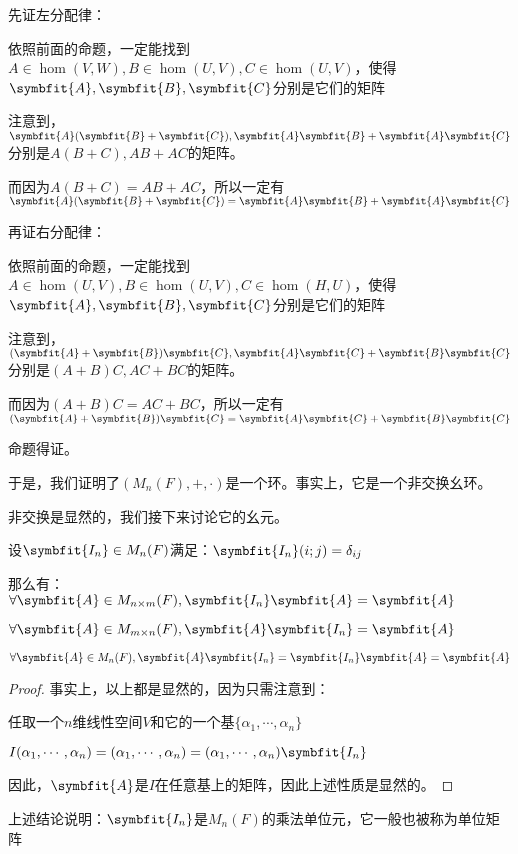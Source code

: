 \documentclass[12pt, a4paper, oneside, UTF8]{ctexbook}
\begin{document}
\begin{para}{0}
\begin{proposition}
						先证左分配律：
						
						依照前面的命题，一定能找到$A \in \hom(V,W),B \in \hom(U,V),C \in \hom(U,V)$，使得$\symbfit{A},\symbfit{B},\symbfit{C}$分别是它们的矩阵

						注意到，$\symbfit{A}(\symbfit{B}+\symbfit{C}),\symbfit{A}\symbfit{B}+\symbfit{A}\symbfit{C}$分别是$A(B+C),AB+AC$的矩阵。
						
						而因为$A(B+C)=AB+AC$，所以一定有$\symbfit{A}(\symbfit{B}+\symbfit{C})=\symbfit{A}\symbfit{B}+\symbfit{A}\symbfit{C}$

						再证右分配律：

						依照前面的命题，一定能找到$A \in \hom(U,V),B \in \hom(U,V),C \in \hom(H,U)$，使得$\symbfit{A},\symbfit{B},\symbfit{C}$分别是它们的矩阵

						注意到，$(\symbfit{A}+\symbfit{B})\symbfit{C},\symbfit{A}\symbfit{C}+\symbfit{B}\symbfit{C}$分别是$(A+B)C,AC+BC$的矩阵。
						
						而因为$(A+B)C=AC+BC$，所以一定有$(\symbfit{A}+\symbfit{B})\symbfit{C}=\symbfit{A}\symbfit{C}+\symbfit{B}\symbfit{C}$
						
						命题得证。
					\end{proposition}
					于是，我们证明了$(M_n(F),+,\cdot)$是一个环。事实上，它是一个非交换幺环。

					非交换是显然的，我们接下来讨论它的幺元。
					\begin{proposition}
						设$\symbfit{I_n} \in M_n(F)$满足：$\symbfit{I_n}(i;j)=\delta_{ij}$

						那么有：$\forall \symbfit{A} \in M_{n \times m}(F),\symbfit{I_n}\symbfit{A}=\symbfit{A}$

						$\forall \symbfit{A} \in M_{m \times n}(F),\symbfit{A}\symbfit{I_n}=\symbfit{A}$

						$\forall \symbfit{A} \in M_{n}(F),\symbfit{A}\symbfit{I_n}=\symbfit{I_n}\symbfit{A}=\symbfit{A}$
					\end{proposition}
					\begin{proof}
						事实上，以上都是显然的，因为只需注意到：

						任取一个$n$维线性空间$V$和它的一个基$\{\alpha_1,\cdots,\alpha_n\}$

						$I(\alpha_1,\cdots,\alpha_n)=(\alpha_1,\cdots,\alpha_n)=(\alpha_1,\cdots,\alpha_n)\symbfit{I_n}$

						因此，$\symbfit{A}$是$I$在任意基上的矩阵，因此上述性质是显然的。
					\end{proof}
					上述结论说明：$\symbfit{I_n}$是$M_n(F)$的乘法单位元，它一般也被称为单位矩阵


\end{para}
\end{document}
